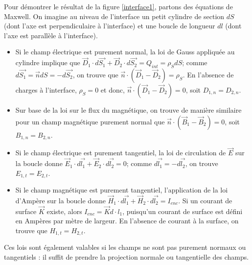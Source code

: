  Pour démontrer le résultat de la figure \ref{interface1}, partons des équations de Maxwell. On imagine au niveau de l'interface un petit cylindre de section $dS$ (dont l'axe est perpendiculaire à l'interface) et une boucle de longueur $dl$ (dont l'axe est parallèle à l'interface). 
\begin{itemize}
\item Si le champ électrique est purement normal, la loi de Gauss appliquée au cylindre  implique que $\vec{D}_{1}\cdot d\vec{S_1} +  \vec{D}_{2}\cdot d\vec{S_2} = Q_{int} = \rho_S dS$; comme $d\vec{S_1} = \vec{n}dS = -d\vec{S_2}$, on trouve que $\vec{n}\cdot(\vec{D}_{1} - \vec{D}_{2}) = \rho_S$. En l'absence de charges à l'interface, $\rho_S = 0$ et donc, $\vec{n}\cdot(\vec{D}_{1} - \vec{D}_{2}) = 0$, soit ${D}_{1,n} = {D}_{2,n}$.
\item Sur base de la loi sur le flux du magnétique, on trouve de manière similaire pour un champ magnétique purement normal que $\vec{n}\cdot(\vec{B}_{1} - \vec{B}_{2}) = 0$, soit ${B}_{1,n} = {B}_{2,n}$.
\item Si le champ électrique est purement tangentiel, la loi de circulation de $\vec{E}$ sur la boucle donne $\vec{E}_1\cdot d\vec{l_1} + \vec{E}_2\cdot d\vec{l_2} = 0$; comme $d\vec{l_1} = - d\vec{l_2}$, on trouve  ${E}_{1,t} =  {E}_{2,t}$.
\item Si le champ magnétique est purement tangentiel, l'application de la loi d'Ampère sur la boucle donne $\vec{H}_1\cdot d\vec{l_1} + \vec{H}_2\cdot d\vec{l_2} = I_{enc}$. Si un courant de surface $\vec{K}$ existe, alors $I_{enc} = \vec{K} d\cdot{l_1}$, puisqu'un courant de surface est défini en Ampères par mètre de largeur. En l'absence de courant à la surface, on trouve que ${H}_{1,t} =  {H}_{2,t}$.
\end{itemize} 
 
Ces lois sont également valables si les champs ne sont pas purement normaux ou tangentiels : il suffit de prendre la projection normale ou tangentielle des champs.
 

